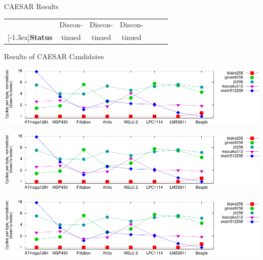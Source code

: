 \documentclass[xcolor=pdftex,dvipsnames,table,final]{beamer}
\newcommand{\rb}[1]{\raisebox{1.3ex}[-1.3ex]{#1}}
\begin{document}
\begin{frame}[fragile]{}
\begin{columns}[t, totalwidth=\textwidth]
\begin{column}{.675\linewidth}
\begin{columns}
\begin{column}{.473\linewidth}
\begin{block}{CAESAR Results}
\begin{center}
{\begin{tabular}{|r||c|c|c|c||c|c}
                                  &Discon-   &Discon-     &Discon-        &              &              &               \\ 
            \rowcolor{RoyalBlue!5}%
            \rb{\textbf{Status}}  &tinued    &tinued      &tinued         &              &              &               \\ \hline
          \end{tabular}
        }
        \end{center}
       \end{block}
       \begin{block}{Results of CAESAR Candidates}
        \vspace{-1ex}
         \begin{center}
           \includegraphics[width=0.9\linewidth]{../figures/cycles_per_byte}

           \vspace{-1ex}{\small Throughput}\vspace{1ex}

           \includegraphics[width=0.9\linewidth]{../figures/cycles_per_byte}

           \vspace{-1ex}{\small RAM Usage}\vspace{1ex}

           \includegraphics[width=0.9\linewidth]{../figures/cycles_per_byte}

           \vspace{-1ex}{\small ROM Usage}\vspace{1ex}


\end{center}
\end{block}
\end{column}
\end{columns}
\end{column}
\end{columns}
\end{frame}
\end{document}

